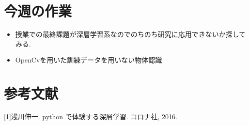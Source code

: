 \section{今週の作業}
\begin{itemize}
        \item 授業での最終課題が深層学習系なのでのちのち研究に応用できないか探してみる.
        \item OpenCvを用いた訓練データを用いない物体認識
\end{itemize}


\section{参考文献}
[1]浅川伸一. python で体験する深層学習. コロナ社, 2016.




